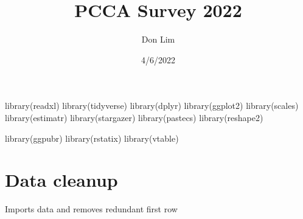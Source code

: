 \documentclass[
]{article}
\title{PCCA Survey 2022}
\author{Don Lim}
\date{4/6/2022}
\newenvironment{Shaded}{\begin{snugshade}}{\end{snugshade}}
\newcommand{\FunctionTok}[1]{\textcolor[rgb]{0.00,0.00,0.00}{#1}}
\newcommand{\NormalTok}[1]{#1}
\begin{document}
\maketitle

{
\setcounter{tocdepth}{2}
\tableofcontents
}
\begin{Shaded}
\begin{Highlighting}[]
\FunctionTok{library}\NormalTok{(readxl)}
\FunctionTok{library}\NormalTok{(tidyverse)}
\FunctionTok{library}\NormalTok{(dplyr)}
\FunctionTok{library}\NormalTok{(ggplot2)}
\FunctionTok{library}\NormalTok{(scales)}
\FunctionTok{library}\NormalTok{(estimatr)}
\FunctionTok{library}\NormalTok{(stargazer)}
\FunctionTok{library}\NormalTok{(pastecs)}
\FunctionTok{library}\NormalTok{(reshape2)}

\FunctionTok{library}\NormalTok{(ggpubr)}
\FunctionTok{library}\NormalTok{(rstatix)}
\FunctionTok{library}\NormalTok{(vtable)}
\end{Highlighting}
\end{Shaded}

\hypertarget{data-cleanup}{%
\section{Data cleanup}\label{data-cleanup}}

Imports data and removes redundant first row
\end{document}

